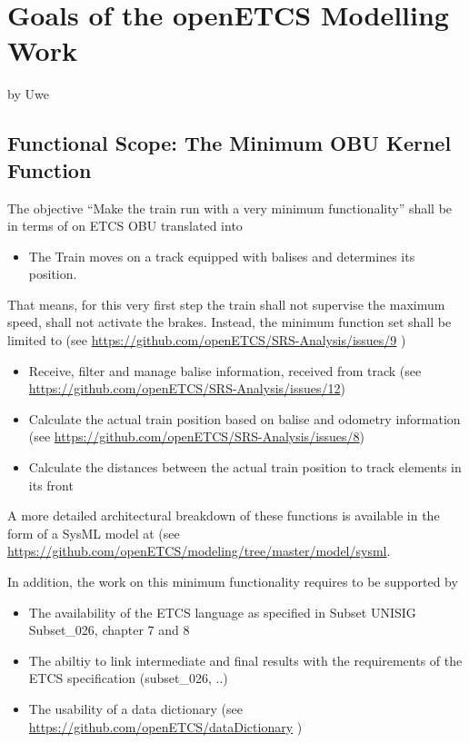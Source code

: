 \section{Goals of the openETCS Modelling Work}
by Uwe


\subsection{Functional Scope: The Minimum OBU Kernel Function}
\label{sec:FunctionalScopeTheMinimumOBUKernelFunction}

The objective “Make the train run with a very minimum functionality” shall be in terms of on ETCS OBU translated into 
\begin{itemize}
	\item The Train moves on a track equipped with balises and determines its position.
\end{itemize}

That means, for this very first step the train shall not supervise the maximum speed, shall not activate the brakes. Instead, the minimum function set shall be limited to (see \url{https://github.com/openETCS/SRS-Analysis/issues/9} ) 
\begin{itemize}
	\item Receive, filter and manage balise information, received from track (see \url{https://github.com/openETCS/SRS-Analysis/issues/12})
	\item Calculate the actual train position based on balise and odometry information (see \url{https://github.com/openETCS/SRS-Analysis/issues/8})
	\item Calculate the distances between the actual train position to track elements in its front
\end{itemize}

A more detailed architectural breakdown of these functions is available in the form of a SysML model at (see \url{https://github.com/openETCS/modeling/tree/master/model/sysml}. 

In addition, the work on this minimum functionality requires to be supported by
\begin{itemize}
	\item The availability of the ETCS language as specified in Subset UNISIG Subset\_026, chapter 7 and 8
	\item The abiltiy to link intermediate and final results with the requirements of the ETCS specification (subset\_026, ..) 
	\item The usability of a data dictionary (see \url{https://github.com/openETCS/dataDictionary} )
\end{itemize}


